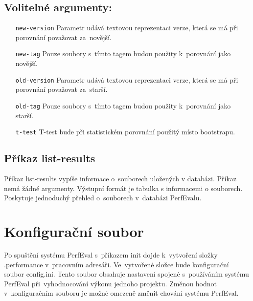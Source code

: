 \subsection*{Volitelné argumenty:}
\begin{itemize}[label=\texttt{\textbf{\textendash}}]
    \item[\texttt{new-version}] Parametr udává textovou reprezentaci verze, která se má při porovnání považovat za~novější.
    \item[\texttt{new-tag}]     Pouze soubory s~tímto tagem budou použity k~porovnání jako novější.
    \item[\texttt{old-version}] Parametr udává textovou reprezentaci verze, která se má při porovnání považovat za~starší.
    \item[\texttt{old-tag}]     Pouze soubory s~tímto tagem budou použity k~porovnání jako starší.
    \item[\texttt{t-test}]      T-test bude při statistickém porovnání použitý místo bootstrapu.
\end{itemize}

\subsection{Příkaz list-results}

Příkaz list-results vypíše informace o~souborech uložených v databázi. Příkaz nemá
žádné argumenty. Výstupní formát je tabulka s informacemi o souborech. Poskytuje jednoduchý
přehled o~souborech v~databázi PerfEvalu.

\section{Konfigurační soubor}

Po spuštění systému PerfEval s~příkazem init dojde k~vytvoření složky .performance
v~pracovním adresáři. Ve~vytvořené složce bude konfigurační soubor config.ini.
Tento soubor obsahuje nastavení spojené s~používáním systému PerfEval při~vyhodnocování
výkonu jednoho projektu. Změnou hodnot v~konfiguračním souboru je možné omezeně změnit chování
systému PerfEval.

